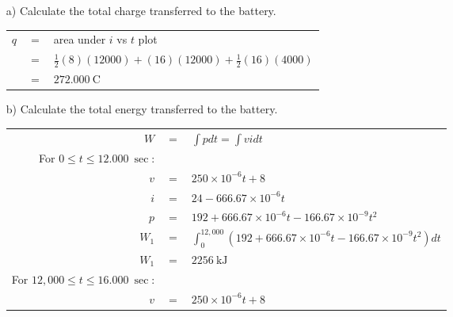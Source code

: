 \documentclass[a4paper]{article}
\begin{document}
\begin{itemize}
	      \begin{itemize}
	      	\item[a)] Calculate the total charge transferred to the battery. \\
	      	      \begin{tabular}{r c l}
	      	      	$q$ & $=$ & area under $i$ vs $t$ plot                                    \\
	      	      	    & $=$ & $\frac{1}{2}(8)(12000) + (16)(12000) + \frac{1}{2}(16)(4000)$ \\
	      	      	    & $=$ & $\SI{272,000}{\coulomb}$                                      \\
	      	      \end{tabular}
	      	\item[b)] Calculate the total energy transferred to the battery. \\
	      	      \begin{tabular}{r c l}
	      	      	$W$                                         & $=$ & $\int pdt = \int vidt$                                                      \\
	      	      	For $0 \leq t \leq \SI{12,000}{\sec}$:      &     &                                                                             \\
	      	      	$v$                                         & $=$ & $250\times10^{-6}t + 8$                                                     \\
	      	      	$i$                                         & $=$ & $24 - 666.67\times10^{-6}t$                                                 \\
	      	      	$p$                                         & $=$ & $192 + 666.67\times10^{-6}t - 166.67\times10^{-9}t^{2}$                     \\
	      	      	$W_{1}$                                     & $=$ & $\int_{0}^{12,000} (192 + 666.67\times10^{-6}t - 166.67\times10^{-9}t^2)dt$ \\
	      	      	$W_{1}$                                     & $=$ & $\SI{2256}{\kilo\joule}$                                                    \\
	      	      	For $12,000 \leq t \leq \SI{16,000}{\sec}$: &     &                                                                             \\
	      	      	$v$                                         & $=$ & $250\times10^{-6}t + 8$                                                     \\

\end{tabular}
\end{itemize}
\end{itemize}
\end{document}

